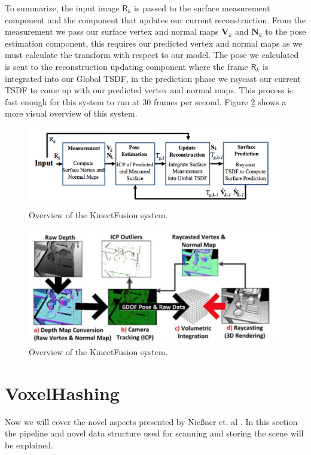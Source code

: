 \documentclass[10pt, twocolumn]{article}
\begin{document}
To summarize, the input image $\mathsf{R}_k$ is passed to
the surface measurement component and the component that updates our current
reconstruction. From the measurement we pass our surface vertex and normal maps
$\mathbf{V}_k$ and $\mathbf{N}_k$ to the pose estimation component, this
requires our predicted vertex and normal maps as we
must calculate the transform with respect to our model. The pose we calculated
is sent to the reconstruction updating component where the frame $\mathsf{R}_k$
is integrated into our Global TSDF, in the prediction phase we raycast our
current TSDF to come up with our predicted vertex and normal maps. This process
is fast enough for this system to run at 30 frames per second. Figure
\ref{fig:visworkflow} shows a more visual overview of this system.

\begin{figure}
  \centering
  \includegraphics[width=1.0\linewidth]{workflow}
  \caption{Overview of the KinectFusion system.}
  \label{fig:workflow}
\end{figure}

\begin{figure}
  \centering
  \includegraphics[width=1.0\linewidth]{kinectfusion}
  \caption{Overview of the KinectFusion system.}
  \label{fig:visworkflow}
\end{figure}



\section{VoxelHashing}
Now we will cover the novel aspects presented by Nie{\ss}ner et. al
\cite{niessner2013hashing}. In this section the pipeline and novel data structure used for
scanning and storing the scene will be explained. 
\end{document}
